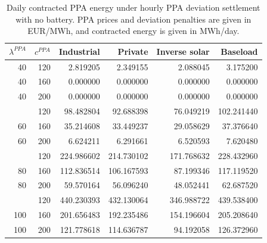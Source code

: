 \begin{table}[p]
\centering
\small
\caption{Daily contracted PPA energy under hourly PPA deviation settlement with no battery. PPA prices and deviation penalties are given in EUR/MWh, and contracted energy is given in MWh/day.}
\label{tab:contracted-energy-hourly-p-0-e-0}
\begin{tabular*}{\textwidth}{@{\extracolsep{\fill}}rrrrrr@{}}
\toprule
$\lambda^{PPA}$ & $c^{PPA}$ & Industrial & Private & Inverse solar & Baseload \\
\midrule
40 & 120 & 2.819205 & 2.349155 & 2.088045 & 3.175200 \\
40 & 160 & 0.000000 & 0.000000 & 0.000000 & 0.000000 \\
40 & 200 & 0.000000 & 0.000000 & 0.000000 & 0.000000 \\
\addlinespace
60 & 120 & 98.482804 & 92.688398 & 76.049219 & 102.241440 \\
60 & 160 & 35.214608 & 33.449237 & 29.058629 & 37.376640 \\
60 & 200 & 6.624211 & 6.291661 & 6.520593 & 7.620480 \\
\addlinespace
80 & 120 & 224.986602 & 214.730102 & 171.768632 & 228.432960 \\
80 & 160 & 112.836514 & 106.167593 & 87.199346 & 117.119520 \\
80 & 200 & 59.570164 & 56.096240 & 48.052441 & 62.687520 \\
\addlinespace
100 & 120 & 440.230393 & 432.130064 & 346.988722 & 439.538400 \\
100 & 160 & 201.656483 & 192.235486 & 154.196604 & 205.208640 \\
100 & 200 & 121.778618 & 114.636787 & 94.192058 & 126.372960 \\
\bottomrule
\end{tabular*}
\end{table}


